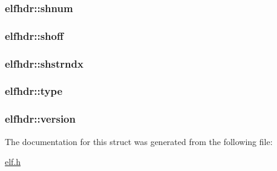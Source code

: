 \subsubsection[{\texorpdfstring{shnum}{shnum}}]{ elfhdr\+::shnum}\hypertarget{structelfhdr_aebf9526933b9f0502bdbafacce3734c1}{}\label{structelfhdr_aebf9526933b9f0502bdbafacce3734c1}
\subsubsection[{\texorpdfstring{shoff}{shoff}}]{ elfhdr\+::shoff}\hypertarget{structelfhdr_a465ccdf83d0e26d129d723a493a6e764}{}\label{structelfhdr_a465ccdf83d0e26d129d723a493a6e764}
\subsubsection[{\texorpdfstring{shstrndx}{shstrndx}}]{ elfhdr\+::shstrndx}\hypertarget{structelfhdr_a84f3d7712c99bfea3f4be42728dc0a0e}{}\label{structelfhdr_a84f3d7712c99bfea3f4be42728dc0a0e}
\subsubsection[{\texorpdfstring{type}{type}}]{ elfhdr\+::type}\hypertarget{structelfhdr_a2cd2eaf0c952e30f8196890787ef68fe}{}\label{structelfhdr_a2cd2eaf0c952e30f8196890787ef68fe}
\subsubsection[{\texorpdfstring{version}{version}}]{ elfhdr\+::version}\hypertarget{structelfhdr_abb1c8274f47cfdbbcefe44af2d5c723d}{}\label{structelfhdr_abb1c8274f47cfdbbcefe44af2d5c723d}


The documentation for this struct was generated from the following file\+:\begin{DoxyCompactItemize}
\item 
\hyperlink{elf_8h}{elf.\+h}\end{DoxyCompactItemize}
